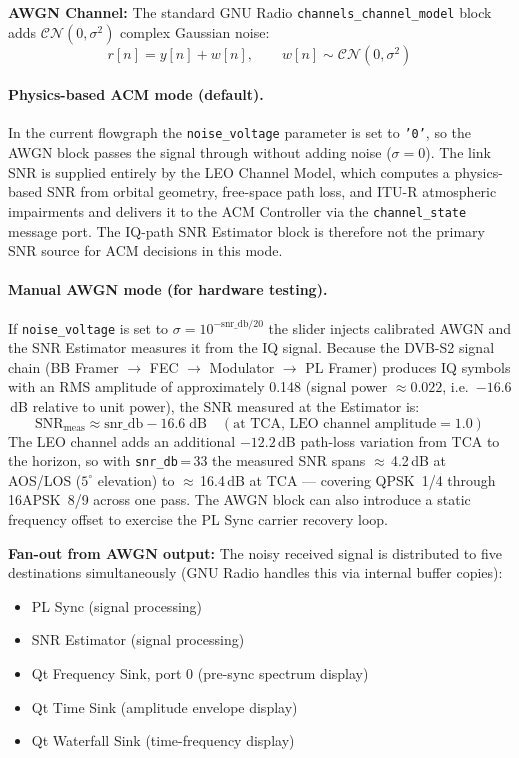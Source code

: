 \documentclass[12pt,a4paper]{report}
\begin{document}
\textbf{AWGN Channel:} The standard GNU Radio \texttt{channels\_channel\_model}
block adds $\mathcal{CN}(0, \sigma^2)$ complex Gaussian noise:
\begin{equation}
    r[n] = y[n] + w[n], \qquad w[n] \sim \mathcal{CN}(0, \sigma^2)
\end{equation}

\paragraph{Physics-based ACM mode (default).}
In the current flowgraph the \texttt{noise\_voltage} parameter is set to
\texttt{'0'}, so the AWGN block passes the signal through without adding noise
($\sigma = 0$).  The link SNR is supplied entirely by the LEO Channel Model,
which computes a physics-based SNR from orbital geometry, free-space path loss,
and ITU-R atmospheric impairments and delivers it to the ACM Controller via the
\texttt{channel\_state} message port.  The IQ-path SNR Estimator block is
therefore not the primary SNR source for ACM decisions in this mode.

\paragraph{Manual AWGN mode (for hardware testing).}
If \texttt{noise\_voltage} is set to $\sigma = 10^{-\text{snr\_db}/20}$ the
slider injects calibrated AWGN and the SNR Estimator measures it from the IQ
signal.  Because the DVB-S2 signal chain (BB Framer $\to$ FEC $\to$ Modulator
$\to$ PL Framer) produces IQ symbols with an RMS amplitude of approximately
0.148 (signal power $\approx 0.022$, i.e.\ $-16.6$\,dB relative to unit
power), the SNR measured at the Estimator is:
\begin{equation}
    \text{SNR}_\text{meas} \approx \text{snr\_db} - 16.6\;\text{dB}
    \quad (\text{at TCA, LEO channel amplitude} = 1.0)
    \label{eq:snr_offset}
\end{equation}
The LEO channel adds an additional $-12.2$\,dB path-loss variation from TCA
to the horizon, so with \texttt{snr\_db}\,=\,33 the measured SNR spans
$\approx$\,4.2\,dB at AOS/LOS ($5^\circ$ elevation) to $\approx$\,16.4\,dB
at TCA --- covering QPSK~1/4 through 16APSK~8/9 across one pass.
The AWGN block can also introduce a static frequency offset to exercise the
PL Sync carrier recovery loop.

\textbf{Fan-out from AWGN output:} The noisy received signal is distributed to
five destinations simultaneously (GNU Radio handles this via internal buffer
copies):
\begin{itemize}[nosep]
    \item PL Sync (signal processing)
    \item SNR Estimator (signal processing)
    \item Qt Frequency Sink, port 0 (pre-sync spectrum display)
    \item Qt Time Sink (amplitude envelope display)
    \item Qt Waterfall Sink (time-frequency display)
\end{itemize}
\end{document}
